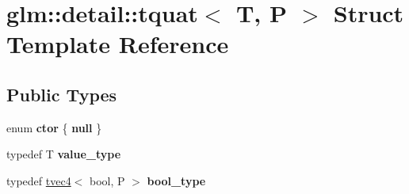 \hypertarget{structglm_1_1detail_1_1tquat}{\section{glm\-:\-:detail\-:\-:tquat$<$ T, P $>$ Struct Template Reference}
\label{structglm_1_1detail_1_1tquat}
}
\subsection*{Public Types}
\begin{DoxyCompactItemize}
\item 
enum {\bfseries ctor} \{ {\bfseries null}
 \}
\item 
\hypertarget{structglm_1_1detail_1_1tquat_af313f5388bc71d19ec712f20fe24cc9b}{typedef T {\bfseries value\-\_\-type}}\label{structglm_1_1detail_1_1tquat_af313f5388bc71d19ec712f20fe24cc9b}

\item 
\hypertarget{structglm_1_1detail_1_1tquat_a22ca5a5296466eb23f4f499ffecc8d46}{typedef \hyperlink{structglm_1_1detail_1_1tvec4}{tvec4}$<$ bool, P $>$ {\bfseries bool\-\_\-type}}\label{structglm_1_1detail_1_1tquat_a22ca5a5296466eb23f4f499ffecc8d46}

\end{DoxyCompactItemize}
